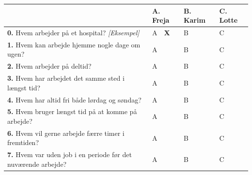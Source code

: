 \begin{center}
\renewcommand{\arraystretch}{1.20}
\begin{tabularx}{\linewidth}{@{} >{\raggedright\arraybackslash}X >{\centering\arraybackslash}p{1.9cm} >{\centering\arraybackslash}p{1.9cm} >{\centering\arraybackslash}p{1.9cm} @{}}
\toprule
 & \textbf{A. Freja} & \textbf{B. Karim} & \textbf{C. Lotte} \\
\midrule
\textbf{0.} Hvem arbejder på et hospital? \textit{[Eksempel]} & A\ \ \textbf{X} & B\ \ \underline{\hspace{0.5cm}} & C\ \ \underline{\hspace{0.5cm}} \\
\midrule
\textbf{1.} Hvem kan arbejde hjemme nogle dage om ugen? & A\ \ \underline{\hspace{0.5cm}} & B\ \ \underline{\hspace{0.5cm}} & C\ \ \underline{\hspace{0.5cm}} \\
\textbf{2.} Hvem arbejder på deltid? & A\ \ \underline{\hspace{0.5cm}} & B\ \ \underline{\hspace{0.5cm}} & C\ \ \underline{\hspace{0.5cm}} \\
\textbf{3.} Hvem har arbejdet det samme sted i længst tid? & A\ \ \underline{\hspace{0.5cm}} & B\ \ \underline{\hspace{0.5cm}} & C\ \ \underline{\hspace{0.5cm}} \\
\textbf{4.} Hvem har altid fri både lørdag og søndag? & A\ \ \underline{\hspace{0.5cm}} & B\ \ \underline{\hspace{0.5cm}} & C\ \ \underline{\hspace{0.5cm}} \\
\textbf{5.} Hvem bruger længst tid på at komme på arbejde? & A\ \ \underline{\hspace{0.5cm}} & B\ \ \underline{\hspace{0.5cm}} & C\ \ \underline{\hspace{0.5cm}} \\
\textbf{6.} Hvem vil gerne arbejde færre timer i fremtiden? & A\ \ \underline{\hspace{0.5cm}} & B\ \ \underline{\hspace{0.5cm}} & C\ \ \underline{\hspace{0.5cm}} \\
\textbf{7.} Hvem var uden job i en periode før det nuværende arbejde? & A\ \ \underline{\hspace{0.5cm}} & B\ \ \underline{\hspace{0.5cm}} & C\ \ \underline{\hspace{0.5cm}} \\
\bottomrule
\end{tabularx}
\end{center}

